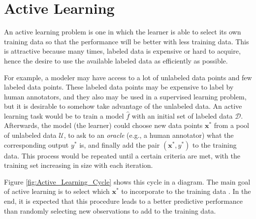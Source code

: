 
\chapter{Active Learning}
\label{ch:active_learning}



An active learning problem is one in which the learner is able to select its own training data so that the performance will be better with less training data. This is attractive because many times, labeled data is expensive or hard to acquire, hence the desire to use the available labeled data as efficiently as possible.

For example, a modeler may have access to a lot of unlabeled data points and few labeled data points. These labeled data points may be expensive to label by human annotators, and they also may be used in a supervised learning problem, but it is desirable to somehow take advantage of the unlabeled data. An active learning task would be to train a model $\hat{f}$ with an initial set of labeled data $\mathcal{D}$. Afterwards, the model (the learner) could choose new data points $\boldsymbol{x}^*$ from a pool of unlabeled data $\mathcal{U}$, to ask to an \textit{oracle} (e.g., a human annotator) what the corresponding output $y^*$ is, and finally add the pair $(\boldsymbol{x}^*, {y}^*)$ to the training data. This process would be repeated until a certain criteria are met, with the training set increasing in size with each iteration.

Figure \ref{fig:Active_Learning_Cycle} shows this cycle in a diagram. The main goal of active learning is to select which $\boldsymbol{x}^*$ to incorporate to the training data \cite{cohn1996active}. In the end, it is expected that this procedure leads to a better predictive performance than randomly selecting new observations to add to the training data.


